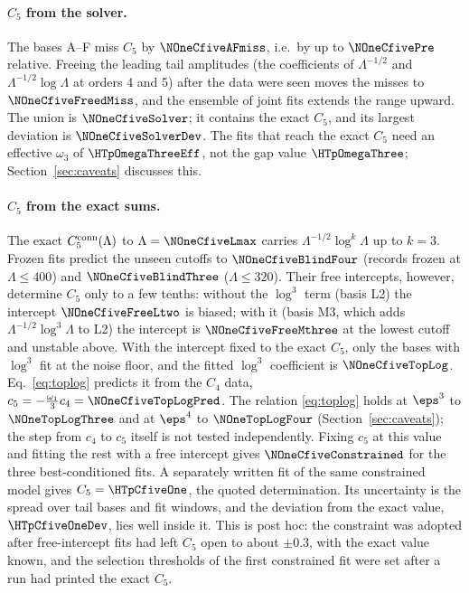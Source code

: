 \paragraph{$C_5$ from the solver.} The bases A--F miss $C_5$ by $\NOneCfiveAFmiss$, i.e.\ by up to $\NOneCfivePre$
relative. Freeing the leading tail amplitudes (the coefficients of $\Lambda^{-1/2}$ and $\Lambda^{-1/2}\log\Lambda$ at
orders 4 and 5) after the data were seen moves the misses to $\NOneCfiveFreedMiss$, and the ensemble of joint fits
extends the range upward. The union is $\NOneCfiveSolver$; it contains the exact $C_5$, and its largest deviation is
$\NOneCfiveSolverDev$. The fits that reach the exact $C_5$ need an effective $\omega_3$ of $\HTpOmegaThreeEff$, not the
gap value $\HTpOmegaThree$; Section~\ref{sec:caveats} discusses this.

\paragraph{$C_5$ from the exact sums.}\label{d1:sec:exact} The exact $C_5^{\rm conn}(\Lambda)$ to
$\Lambda=\NOneCfiveLmax$ carries $\Lambda^{-1/2}\log^k\Lambda$ up to $k=3$. Frozen fits predict the unseen cutoffs to
$\NOneCfiveBlindFour$ (records frozen at $\Lambda\le400$) and $\NOneCfiveBlindThree$ ($\Lambda\le320$). Their free
intercepts, however, determine $C_5$ only to a few tenths: without the $\log^3$ term (basis L2) the intercept
$\NOneCfiveFreeLtwo$ is biased; with it (basis M3, which adds $\Lambda^{-1/2}\log^3\Lambda$ to L2) the intercept is
$\NOneCfiveFreeMthree$ at the lowest cutoff and unstable above. With the intercept fixed to the exact $C_5$, only the
bases with $\log^3$ fit at the noise floor, and the fitted $\log^3$ coefficient is $\NOneCfiveTopLog$.
Eq.~\eqref{eq:toplog} predicts it from the $C_4$ data, $c_5=-\tfrac{\omega_1}{3}c_4=\NOneCfiveTopLogPred$. The relation
\eqref{eq:toplog} holds at $\eps^3$ to $\NOneTopLogThree$ and at $\eps^4$ to $\NOneTopLogFour$
(Section~\ref{sec:caveats}); the step from $c_4$ to $c_5$ itself is not tested independently. Fixing $c_5$ at this value
and fitting the rest with a free intercept gives $\NOneCfiveConstrained$ for the three best-conditioned fits. A
separately written fit of the same constrained model gives $C_5=\HTpCfiveOne$, the quoted determination. Its
uncertainty is the spread over tail bases and fit windows, and the deviation from the exact value, $\HTpCfiveOneDev$,
lies well inside it. This is post hoc: the constraint was adopted after free-intercept fits had left $C_5$ open to
about $\pm0.3$, with the exact value known, and the selection thresholds of the first constrained fit were set after a
run had printed the exact $C_5$.

